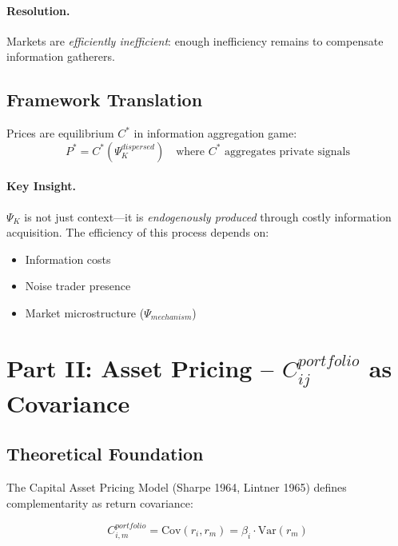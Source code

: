 \paragraph{Resolution.}
Markets are \textit{efficiently inefficient}: enough inefficiency remains to
compensate information gatherers.

\subsection{Framework Translation}

Prices are equilibrium $C^*$ in information aggregation game:
\begin{equation}
P^* = C^*(\Psi_K^{dispersed}) \quad \text{where } C^* \text{ aggregates private signals}
\end{equation}

\paragraph{Key Insight.}
$\Psi_K$ is not just context---it is \textit{endogenously produced} through
costly information acquisition. The efficiency of this process depends on:
\begin{itemize}
    \item Information costs
    \item Noise trader presence
    \item Market microstructure ($\Psi_{mechanism}$)
\end{itemize}


\section{Part II: Asset Pricing -- $C_{ij}^{portfolio}$ as Covariance}
\label{sec:Y-asset-pricing}

\subsection{Theoretical Foundation}

The Capital Asset Pricing Model (Sharpe 1964, Lintner 1965) defines
complementarity as return covariance:

\begin{equation}
\boxed{
C_{i,m}^{portfolio} = \text{Cov}(r_i, r_m) = \beta_i \cdot \text{Var}(r_m)
}
\label{eq:capm-beta}
\end{equation}

